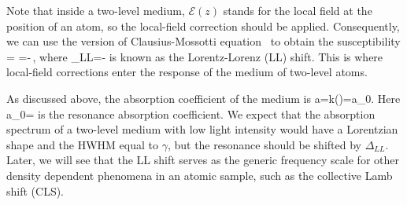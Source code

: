 Note that inside a two-level medium, $\mathcal E(z)$ stands for the local field at the position of an atom, so the local-field correction should be applied. Consequently, we can use the version of Clausius-Mossotti equation~ to obtain the susceptibility
\bea
\chi=
=-\,,
\eea
where
\beq
\Delta_{LL}=-
\eeq
 is known as the Lorentz-Lorenz (LL) shift. This is where local-field corrections enter the response of the medium of two-level atoms.

As discussed above, the absorption coefficient of the medium is
\bea 
a=k\Im(\chi)=a_0.
\eea
Here
\bea
a_0=
\eea
is the resonance absorption coefficient. We expect that the absorption spectrum of a two-level medium with low light intensity would have a Lorentzian shape and the HWHM equal to $\gamma$, but the resonance should be shifted by $\Delta_{LL}$.
Later, we will see that the LL shift serves as the generic frequency scale for other density dependent phenomena in an atomic sample, such as the collective Lamb shift (CLS). 





